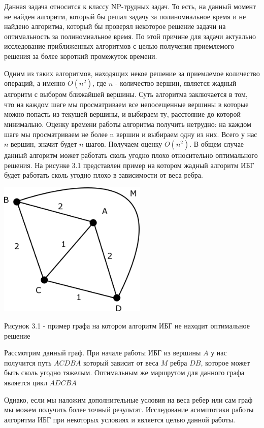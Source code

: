 \documentclass[a4paper, 14pt]{extarticle}
\numberwithin{equation}{section}
\begin{document}
Данная задача относится к классу NP-трудных задач. То есть, на данный момент не найден алгоритм, который бы решал задачу за полиномиальное время и не найдено алгоритма, который бы проверял некоторое решение задачи на оптимальность за полиномиальное время. По этой причине для задачи актуально исследование приближенных алгоритмов с целью получения приемлемого решения за более короткий промежуток времени.

Одним из таких алгоритмов, находящих некое решение за приемлемое количество операций, а именно $O(n^{2})$, где $n$ - количество вершин, является жадный алгоритм с выбором ближайшей вершины. Суть алгоритма заключается в том, что на каждом шаге мы просматриваем все непосещенные вершины в которые можно попасть из текущей вершины, и выбираем ту, расстояние до которой минимально. Оценку времени работы алгоритма получить нетрудно: на каждом шаге мы просматриваем не более n вершин и выбираем одну из них. Всего у нас $n$ вершин, значит будет $n$ шагов. Получаем оценку $O(n^{2})$. В общем случае данный алгоритм может работать сколь угодно плохо относительно оптимального решения. На рисунке 3.1 представлен пример на котором жадный алгоритм ИБГ будет работать сколь угодно плохо в зависимости от веса ребра.

\begin{center}
\includegraphics[width=200pt]{ris_example.png}
\end{center}

Рисунок 3.1 - пример графа на котором алгоритм ИБГ не находит оптимальное решение

Рассмотрим данный граф. При начале работы ИБГ из вершины $A$ у нас получится путь $ACDBA$ который зависит от веса $M$ ребра $DB$, которое может быть сколь угодно тяжелым. Оптимальным же маршрутом для данного графа является цикл $ADCBA$

Однако, если мы наложим дополнительные условия на веса ребер или сам граф мы можем получить более точный результат. Исследование асимптотики работы алгоритма ИБГ при некоторых условиях и является целью данной работы. \newline
\end{document}
